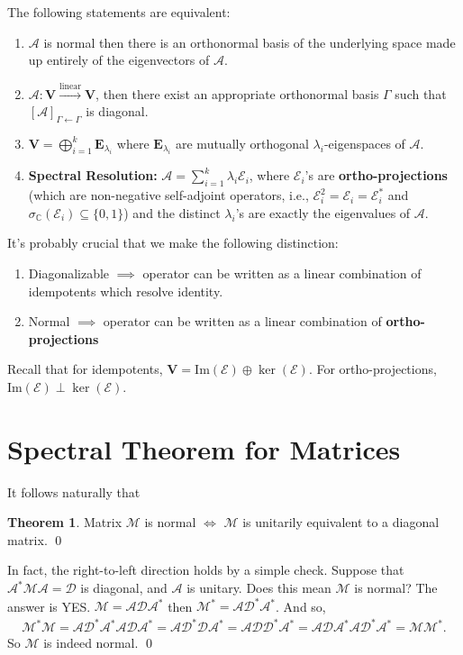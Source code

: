 \documentclass{book}
\theoremstyle{definition}
\newtheorem{thm}{Theorem}[section]
\newcommand{\C}{\mathbb{C}}
\newcommand{\V}{\mathbf{V}}
\newcommand{\A}{\mathcal{A}}
\newcommand{\M}{\mathcal{M}}
\newcommand{\E}{\mathcal{E}}
\newcommand{\ima}{\text{Im}}
\newcommand{\lin}{\overset{\text{linear}}{\longrightarrow}}
\begin{document}
The following statements are equivalent:
\begin{enumerate}
	\item $\A$ is normal then there is an orthonormal basis of the underlying space made up entirely of the eigenvectors of $\A$.
	\item $\A: \V \lin \V$, then there exist an appropriate orthonormal basis $\Gamma$ such that $[\A]_{\Gamma\leftarrow\Gamma}$ is diagonal.
	\item $\V = \bigoplus_{i=1}^k \mathbf{E}_{\lambda_i}$ where $\mathbf{E}_{\lambda_i}$ are mutually orthogonal $\lambda_i$-eigenspaces of $\A$. 
	\item \textbf{Spectral Resolution:} $\A = \sum^k_{i=1}\lambda_i\E_i$, where $\E_i$'s are \textbf{ortho-projections} (which are non-negative self-adjoint operators, i.e., $\E_i^2 = \E_i = \E_i^*$ and $\sigma_\C(\E_i) \subseteq \{0,1 \}$) and the distinct $\lambda_i$'s are exactly the eigenvalues of $\A$. 
\end{enumerate}


It's probably crucial that we make the following distinction:
\begin{enumerate}
	\item Diagonalizable $\implies$ operator can be written as a linear combination of idempotents which resolve identity.
	\item Normal $\implies$ operator can be written as a linear combination of \textbf{ortho-projections}
\end{enumerate}

Recall that for idempotents, $\V = \ima(\E) \oplus \ker(\E)$. For ortho-projections, $\ima(\E) \perp \ker(\E)$. 



\section{Spectral Theorem for Matrices}

It follows naturally that 

\begin{thm}
	Matrix $\M$ is normal $\iff$ $\M$ is unitarily equivalent to a diagonal matrix. \qed
\end{thm}

In fact, the right-to-left direction holds by a simple check. Suppose that $\A^*\M\A = \mathcal{D}$ is diagonal, and $\A$ is unitary. Does this mean $\M$ is normal? The answer is YES. $\M = \A \mathcal{D} \A^*$ then $\M^* = \A \mathcal{D}^* \A^*$. And so,
\begin{align*}
\M^* \M = \A \mathcal{D}^* \A^*\A \mathcal{D} \A^* = \A \mathcal{D}^*\mathcal{D}\A^* = \A \mathcal{D}\mathcal{D}^*\A^* = \A \mathcal{D} \A^*\A \mathcal{D}^* \A^*  =\M\M^*.
\end{align*}
So $\M$ is indeed normal. \qed
\end{document}
